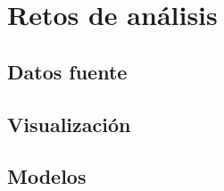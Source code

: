 \section{Retos de análisis}
\label{section:retos}

\subsection{Datos fuente}
\label{subsection:retos:datos}

\tinylipsum

\subsection{Visualización}
\label{subsection:retos:viz}

\tinylipsum

\subsection{Modelos}
\label{subsection:retos:modelos}

\tinylipsum

